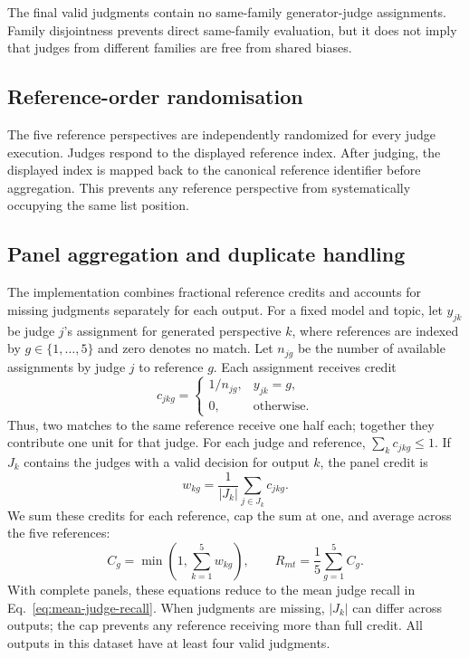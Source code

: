\documentclass[11pt,a4paper]{article}
\begin{document}
The final valid judgments contain no same-family generator-judge assignments. Family disjointness prevents direct same-family evaluation, but it does not imply that judges from different families are free from shared biases.

\subsection{Reference-order randomisation}
\label{app:reference_randomization}

The five reference perspectives are independently randomized for every judge execution. Judges respond to the displayed reference index. After judging, the displayed index is mapped back to the canonical reference identifier before aggregation. This prevents any reference perspective from systematically occupying the same list position.

\subsection{Panel aggregation and duplicate handling}
\label{app:recall_aggregation}

The implementation combines fractional reference credits and accounts for missing judgments separately for each output. For a fixed model and topic, let $y_{jk}$ be judge $j$'s assignment for generated perspective $k$, where references are indexed by $g\in\{1,\ldots,5\}$ and zero denotes no match. Let $n_{jg}$ be the number of available assignments by judge $j$ to reference $g$. Each assignment receives credit
\begin{equation}
c_{jkg}=\begin{cases}
1/n_{jg}, & y_{jk}=g,\\
0, & \text{otherwise}.
\end{cases}
\label{eq:split-credit}
\end{equation}
Thus, two matches to the same reference receive one half each; together they contribute one unit for that judge. For each judge and reference, $\sum_k c_{jkg}\leq 1$. If $J_k$ contains the judges with a valid decision for output $k$, the panel credit is
\begin{equation}
w_{kg}=\frac{1}{|J_k|}\sum_{j\in J_k}c_{jkg}.
\label{eq:panel-credit}
\end{equation}
We sum these credits for each reference, cap the sum at one, and average across the five references:
\begin{equation}
C_g=\min\!\left(1,\sum_{k=1}^{5}w_{kg}\right),
\qquad
R_{mt}=\frac{1}{5}\sum_{g=1}^{5}C_g.
\label{eq:topic-recall}
\end{equation}
With complete panels, these equations reduce to the mean judge recall in Eq.~\ref{eq:mean-judge-recall}. When judgments are missing, $|J_k|$ can differ across outputs; the cap prevents any reference receiving more than full credit. All outputs in this dataset have at least four valid judgments.
\end{document}
